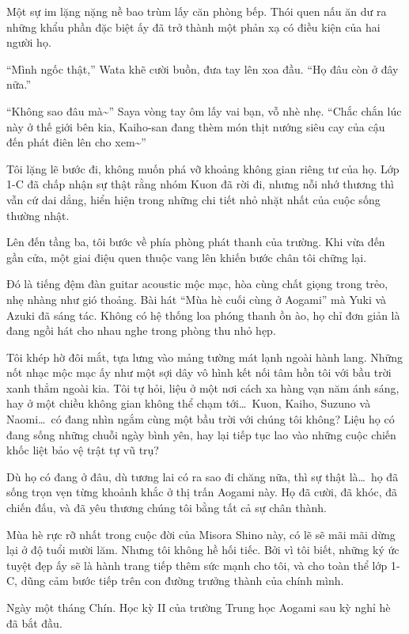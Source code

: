 \documentclass[../main.tex]{subfiles}
\begin{document}
Một sự im lặng nặng nề bao trùm lấy căn phòng bếp. Thói quen nấu ăn dư ra những khẩu phần đặc biệt ấy đã trở thành một phản xạ có điều kiện của hai người họ.

``Mình ngốc thật,'' Wata khẽ cười buồn, đưa tay lên xoa đầu. ``Họ đâu còn ở đây nữa.''

``Không sao đâu mà\~{}'' Saya vòng tay ôm lấy vai bạn, vỗ nhè nhẹ. ``Chắc chắn lúc này ở thế giới bên kia, Kaiho-san đang thèm món thịt nướng siêu cay của cậu đến phát điên lên cho xem\~{}''

Tôi lặng lẽ bước đi, không muốn phá vỡ khoảng không gian riêng tư của họ. Lớp 1-C đã chấp nhận sự thật rằng nhóm Kuon đã rời đi, nhưng nỗi nhớ thương thì vẫn cứ dai dẳng, hiển hiện trong những chi tiết nhỏ nhặt nhất của cuộc sống thường nhật.

Lên đến tầng ba, tôi bước về phía phòng phát thanh của trường. Khi vừa đến gần cửa, một giai điệu quen thuộc vang lên khiến bước chân tôi chững lại.

Đó là tiếng đệm đàn guitar acoustic mộc mạc, hòa cùng chất giọng trong trẻo, nhẹ nhàng như gió thoảng. Bài hát ``Mùa hè cuối cùng ở Aogami'' mà Yuki và Azuki đã sáng tác. Không có hệ thống loa phóng thanh ồn ào, họ chỉ đơn giản là đang ngồi hát cho nhau nghe trong phòng thu nhỏ hẹp.

Tôi khép hờ đôi mắt, tựa lưng vào mảng tường mát lạnh ngoài hành lang. Những nốt nhạc mộc mạc ấy như một sợi dây vô hình kết nối tâm hồn tôi với bầu trời xanh thẳm ngoài kia. Tôi tự hỏi, liệu ở một nơi cách xa hàng vạn năm ánh sáng, hay ở một chiều không gian không thể chạm tới\dots\ Kuon, Kaiho, Suzuno và Naomi\dots\ có đang nhìn ngắm cùng một bầu trời với chúng tôi không? Liệu họ có đang sống những chuỗi ngày bình yên, hay lại tiếp tục lao vào những cuộc chiến khốc liệt bảo vệ trật tự vũ trụ?

Dù họ có đang ở đâu, dù tương lai có ra sao đi chăng nữa, thì sự thật là\dots\ họ đã sống trọn vẹn từng khoảnh khắc ở thị trấn Aogami này. Họ đã cười, đã khóc, đã chiến đấu, và đã yêu thương chúng tôi bằng tất cả sự chân thành.

Mùa hè rực rỡ nhất trong cuộc đời của Misora Shino này, có lẽ sẽ mãi mãi dừng lại ở độ tuổi mười lăm. Nhưng tôi không hề hối tiếc. Bởi vì tôi biết, những ký ức tuyệt đẹp ấy sẽ là hành trang tiếp thêm sức mạnh cho tôi, và cho toàn thể lớp 1-C, dũng cảm bước tiếp trên con đường trưởng thành của chính mình.

\ct

Ngày một tháng Chín. Học kỳ II của trường Trung học Aogami sau kỳ nghỉ hè đã bắt đầu.
\end{document}
